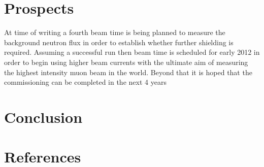 \documentclass[a4paper]{jpconf}
\begin{document}
\section{Prospects}
At time of writing a fourth beam time is being planned to measure the background neutron flux in order to establish whether further shielding is required. Assuming a successful run then beam time is scheduled for early 2012 in order to begin using higher beam currents with the ultimate aim of measuring the highest intensity muon beam in the world. Beyond that it is hoped that the commissioning can be completed in the next 4 years 
\section{Conclusion}

\section*{References}

\end{document}
